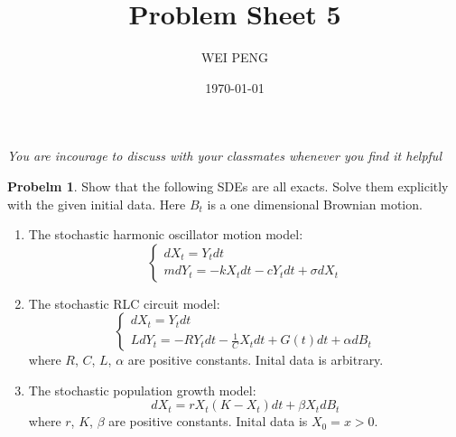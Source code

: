 \documentclass{article}     %
\title{Problem Sheet 5}  %
\author{WEI PENG}      %
\date{\today}      %
\begin{document}
\maketitle                   %

\emph{You are incourage to discuss with your classmates whenever you find it helpful}

\noindent
\textbf{Probelm 1}. Show that the following SDEs are all exacts. Solve them explicitly with the given initial data. Here $B_t$ is a one dimensional Brownian motion.
\begin{enumerate}[(1)]
    \item The stochastic harmonic oscillator motion model:
    \[
     \begin{cases}
     dX_t = Y_tdt\\
     mdY_t = -kX_tdt - cY_tdt + \sigma dX_t
     \end{cases}
     \]
     \item The stochastic RLC circuit model:
     \[\begin{cases}
     dX_t = Y_tdt \\
     LdY_t = - RY_tdt - \frac{1}{C}X_tdt + G(t)dt + \alpha dB_t
     \end{cases}\]
     where $R$, $C$, $L$, $\alpha$ are positive constants. Inital data is arbitrary.
     \item The stochastic population growth model:
     \[ dX_t = rX_t(K - X_t)dt + \beta X_t dB_t\]
     where $r$, $K$, $\beta$ are positive constants. Inital data is $X_0 = x>0$.
\end{enumerate}
\end{document}
